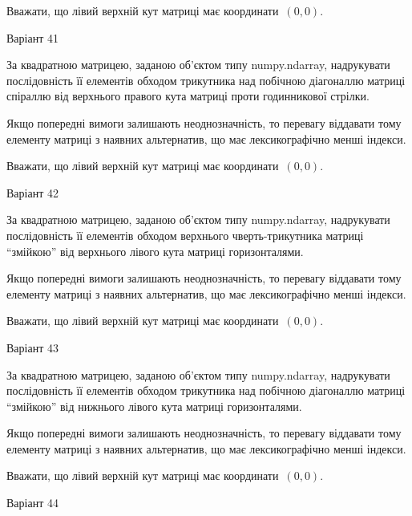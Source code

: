 \documentclass[11pt]{article}
\begin{document}
Вважати, що лівий верхній кут матриці має координати~$(0,0)$.



{\Large \center  Варіант  41\par \bigskip\bigskip}

За квадратною матрицею, заданою об'єктом типу numpy.ndarray, надрукувати послідовність її елементів обходом трикутника над побічною діагоналлю матриці спіраллю від верхнього правого кута матриці проти годинникової стрілки.

\vspace{2mm}
Якщо попередні вимоги залишають неоднозначність, то перевагу віддавати тому елементу матриці з наявних альтернатив, що має лексикографічно менші індекси.

Вважати, що лівий верхній кут матриці має координати~$(0,0)$.



{\Large \center  Варіант  42\par \bigskip\bigskip}

За квадратною матрицею, заданою об'єктом типу numpy.ndarray, надрукувати послідовність її елементів обходом верхнього чверть-трикутника матриці ``змійкою'' від верхнього лівого кута матриці горизонталями.

\vspace{2mm}
Якщо попередні вимоги залишають неоднозначність, то перевагу віддавати тому елементу матриці з наявних альтернатив, що має лексикографічно менші індекси.

Вважати, що лівий верхній кут матриці має координати~$(0,0)$.



{\Large \center  Варіант  43\par \bigskip\bigskip}

За квадратною матрицею, заданою об'єктом типу numpy.ndarray, надрукувати послідовність її елементів обходом трикутника над побічною діагоналлю матриці ``змійкою'' від нижнього лівого кута матриці горизонталями.

\vspace{2mm}
Якщо попередні вимоги залишають неоднозначність, то перевагу віддавати тому елементу матриці з наявних альтернатив, що має лексикографічно менші індекси.

Вважати, що лівий верхній кут матриці має координати~$(0,0)$.



{\Large \center  Варіант  44\par \bigskip\bigskip}
\end{document}
